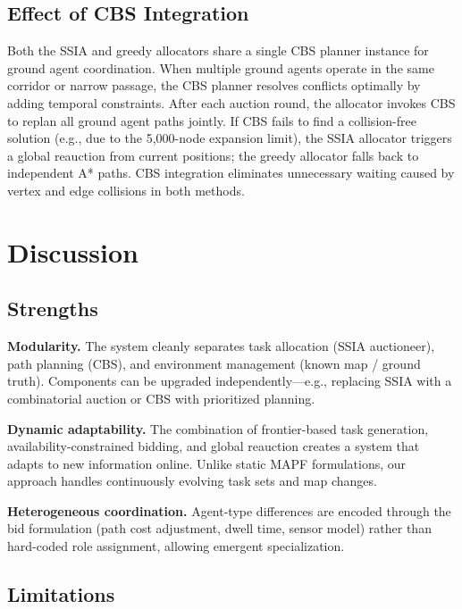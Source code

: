 \documentclass[conference]{IEEEtran}
\begin{document}
\subsection{Effect of CBS Integration}

Both the SSIA and greedy allocators share a single CBS planner instance for ground agent coordination. When multiple ground agents operate in the same corridor or narrow passage, the CBS planner resolves conflicts optimally by adding temporal constraints. After each auction round, the allocator invokes CBS to replan all ground agent paths jointly. If CBS fails to find a collision-free solution (e.g., due to the 5{,}000-node expansion limit), the SSIA allocator triggers a global reauction from current positions; the greedy allocator falls back to independent A* paths. CBS integration eliminates unnecessary waiting caused by vertex and edge collisions in both methods.

\section{Discussion}

\subsection{Strengths}

\textbf{Modularity.} The system cleanly separates task allocation (SSIA auctioneer), path planning (CBS), and environment management (known map / ground truth). Components can be upgraded independently---e.g., replacing SSIA with a combinatorial auction or CBS with prioritized planning.

\textbf{Dynamic adaptability.} The combination of frontier-based task generation, availability-constrained bidding, and global reauction creates a system that adapts to new information online. Unlike static MAPF formulations, our approach handles continuously evolving task sets and map changes.

\textbf{Heterogeneous coordination.} Agent-type differences are encoded through the bid formulation (path cost adjustment, dwell time, sensor model) rather than hard-coded role assignment, allowing emergent specialization.

\subsection{Limitations}
\end{document}
